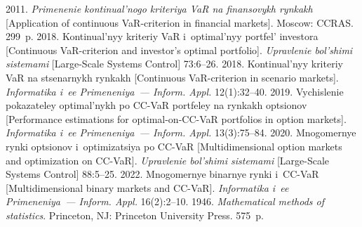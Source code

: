 

  


  \begin{multicols}{2}

\renewcommand{\bibname}{\protect\rmfamily References}

{\small\frenchspacing
 {%
 \begin{thebibliography}{9} 
   2011. \textit{Pri\-me\-ne\-nie kon\-ti\-nu\-al'\-no\-go kri\-te\-riya VaR 
na fi\-nan\-so\-vykh ryn\-kakh} [Application of continuous VaR-criterion in financial 
markets]. Moscow: CCRAS. 299~p.
   2018. Kon\-ti\-nu\-al'\-nyy kri\-te\-riy VaR i~op\-ti\-mal'\-nyy 
port\-fel' in\-ves\-to\-ra [Continuous VaR-criterion and investor's optimal portfolio]. 
\textit{Upravlenie bol'shimi sistemami} [Large-Scale Systems Control] 73:6--26.
   2018. Kon\-ti\-nu\-al'\-nyy kri\-te\-riy VaR na stse\-nar\-nykh 
ryn\-kakh [Continuous VaR-criterion in scenario markets]. \textit{Informatika i~ee 
Primeneniya~--- Inform. Appl.} 12(1):32--40.
   2019. Vy\-chis\-le\-nie po\-ka\-za\-te\-ley op\-ti\-mal'\-nykh po  
CC-VaR port\-fe\-ley na ryn\-kakh op\-tsi\-o\-nov [Performance estimations for  
optimal-on-CC-VaR portfolios in option markets]. \textit{Informatika i~ee 
Primeneniya~--- Inform. Appl.} 13(3):75--84.
   2020. Mno\-go\-mer\-nye ryn\-ki op\-tsi\-o\-nov i~op\-ti\-mi\-za\-tsiya 
po CC-VaR [Multidimensional option markets and optimization on CC-VaR]. 
\textit{Upravlenie bol'shimi sistemami} [Large-Scale Systems Control] 88:5--25.
   2022. Mno\-go\-mer\-nye bi\-nar\-nye ryn\-ki i~CC-VaR 
[Multidimensional binary markets and CC-VaR]. \textit{Informatika i~ee 
Primeneniya~--- Inform. Appl.} 16(2):2--10.
   1946. \textit{Mathematical methods of statistics}. Princeton, 
NJ: Princeton University Press. 575~p.

\end{thebibliography}

 }
 }

\end{multicols}

